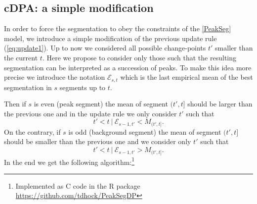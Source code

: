 \documentclass{article}
\begin{document}
\subsection{cDPA: a simple modification}
\label{sec:constrained-dp}

In order to force the segmentation to obey the constraints of the
\ref{PeakSeg} model, we introduce a simple modification of the
previous update rule (\ref{eq:update1}). %
Up to now we considered all possible change-points $t'$ smaller than
the current $t$. Here we propose to consider only those such that the
resulting segmentation can be interpreted as a succession of
peaks. To make this idea more precise we introduce the notation
$\mathcal{E}_{s,t}$ which is the last empirical mean of the best
segmentation in $s$ segments up to $t$.  

Then if $s$ is even (peak segment) the mean of segment $(t', t]$
should be larger than the previous one and in the update rule we only
consider $t'$ such that
\begin{equation}
  \label{eq:even}
   t' < t \ | \ \mathcal{E}_{s-1,t'} < M_{(t', t]}.
\end{equation}
On the contrary, if $s$ is odd (background segment) the mean of
segment $(t', t]$ should be smaller than the previous one and we
consider only $t'$ such that
\begin{equation}
  \label{eq:odd}
   t' < t \ | \ \mathcal{E}_{s-1,t'} > M_{(t', t]}.
\end{equation}
In the end we get the following algorithm:\footnote{Implemented as C
  code in the R package\\ \url{https://github.com/tdhock/PeakSegDP}}
\newcommand{\SWITCH}[1]{\STATE \textbf{switch} (#1)\begin{ALC@g}}
\newcommand{\ENDSWITCH}{\end{ALC@g}}
\newcommand{\CASE}[2]{\STATE \textbf{case} #1\textbf{: } #2}%
\newcommand{\ENDCASE}{}%
\newcommand{\DEFAULT}[1]{\STATE \textbf{default: } \begin{ALC@g}}
\newcommand{\ENDDEFAULT}{\end{ALC@g}\STATE \textbf{end default} }
\newcommand{\FORFOR}[2]{\STATE \textbf{For} #1 \textbf{do} and \textbf{For} #2 \textbf{do} \begin{ALC@g}}
\newcommand{\ENDFORFOR}{\end{ALC@g}\STATE \textbf{End for} and \textbf{End for}  }
\end{document}
